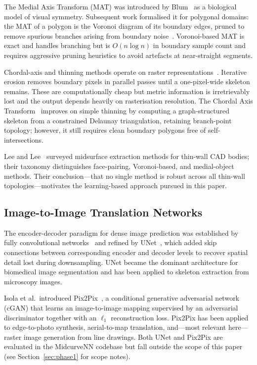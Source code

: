 \documentclass[journal]{IEEEtran}
\begin{document}
The Medial Axis Transform (MAT) was introduced by Blum~\cite{blum1967transform}
as a biological model of visual symmetry.  Subsequent work formalised it for
polygonal domains: the MAT of a polygon is the Voronoi diagram of its boundary
edges, pruned to remove spurious branches arising from boundary
noise~\cite{lavender1992voronoi,sherbrooke1996computation}.  Voronoi-based MAT
is exact and handles branching but is $O(n \log n)$ in boundary sample count
and requires aggressive pruning heuristics to avoid artefacts at near-straight
segments.

Chordal-axis and thinning methods operate on raster
representations~\cite{lee1994building}.  Iterative erosion removes boundary
pixels in parallel passes until a one-pixel-wide skeleton remains.  These are
computationally cheap but metric information is irretrievably lost and the
output depends heavily on rasterisation resolution.  The Chordal Axis
Transform~\cite{prasad1997cat} improves on simple thinning by computing a
graph-structured skeleton from a constrained Delaunay triangulation, retaining
branch-point topology; however, it still requires clean boundary polygons free
of self-intersections.

Lee and Lee~\cite{lee1999midsurface} surveyed midsurface extraction methods
for thin-wall CAD bodies; their taxonomy distinguishes face-pairing,
Voronoi-based, and medial-object methods.  Their conclusion—that no single
method is robust across all thin-wall topologies—motivates the learning-based
approach pursued in this paper.

\subsection{Image-to-Image Translation Networks}

The encoder-decoder paradigm for dense image prediction was established by
fully convolutional networks~\cite{long2015fcn} and refined by
UNet~\cite{ronneberger2015unet}, which added skip connections between
corresponding encoder and decoder levels to recover spatial detail lost during
downsampling.  UNet became the dominant architecture for biomedical image
segmentation and has been applied to skeleton extraction from microscopy images.

Isola et al.\ introduced Pix2Pix~\cite{isola2017pix2pix}, a conditional
generative adversarial network (cGAN) that learns an image-to-image mapping
supervised by an adversarial discriminator together with an $\ell_1$
reconstruction loss.  Pix2Pix has been applied to edge-to-photo synthesis,
aerial-to-map translation, and---most relevant here---raster image generation
from line drawings.  Both UNet and Pix2Pix are evaluated in the MidcurveNN
codebase but fall outside the scope of this paper (see Section~\ref{sec:phase1}
for scope notes).
\end{document}
